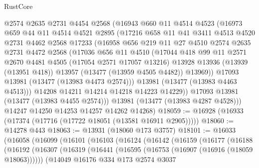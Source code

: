 \begin{lexlean}{RustCore}
\begin{coremodule}
          @2574
          @2635
          @2731
          @4454
          @2568
          (@16943
            @660
            @11
            @4514
            @4523
            (@16973
              @659
              @44
              @11
              @4514
              @4521
              @2895
              (@17216
                @658
                @11
                @41
                @3411
                @4513
                @4520
                @2731
                @4462
                @2568
                @17233
                (@16958
                  @656
                  @219
                  @11
                  @27
                  @4510
                  @2574
                  @2635
                  @2731
                  @4472
                  @2568
                  (@17036
                    @656
                    @11
                    @4510
                    (@17044
                      @418
                      @99
                      @11
                      @2571
                      @2670
                      @4481
                      @4505
                      (@17054 @2571 @17057 @13216)
                      @13928
                      @13936
                      (@13939 (@13951 @418))
                      @13957
                      (@13477 (@13959 @4505 @4482))
                      @13969))
                  @17093
                  @13981
                  (@13477 (@13983 @4473 @2574)))
                @13981
                (@13477 (@13983 @4463 @4513)))
              @14208
              @14211
              @14214
              @14218
              @14223
              @14229))
          @17093
          @13981
          (@13477 (@13983 @4455 @2574)))
        @13981
        (@13477 (@13983 @4287 @4528)))
      @14247
      @14250
      @14253
      @14257
      @14262
      @14268)
@18059 := @16928 (@16933 (@17374 (@17716 (@17722 @18051 (@13581 @16911 @2905)))))
@18060 := @14278 @443
@18063 := @13931 (@18060 @173 @3757)
@18101 := @16033
    (@16058
      (@16099
        (@16101
          (@16103
            (@16124
              (@16142
                (@16159
                  (@16177
                    (@16188
                      (@16192
                        (@16307
                          (@16319
                            (@16441 (@16595 (@16753 (@16907 (@16916 (@18059 @18063))))))
                            (@14049
                              @16176
                              @334
                              @173
                              @2574
                              @3037

\end{coremodule}
\end{lexlean}
